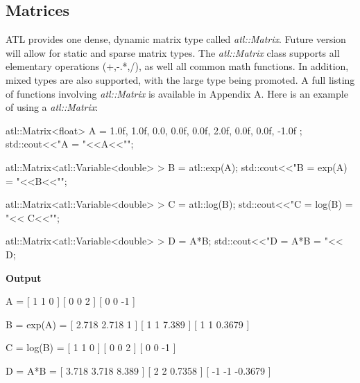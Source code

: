 \documentclass[12pt,a4paper]{article}
\begin{document}
\subsection{Matrices}
ATL provides one dense, dynamic matrix type called \textit{atl::Matrix}. Future version will allow for static and sparse matrix types. The \textit{atl::Matrix} class supports all elementary operations (+,-.*,/), as well all common math functions. In addition, mixed types are also supported, with the large type being promoted. A full listing of functions involving \textit{atl::Matrix} is available in Appendix A. Here is an example of using a \textit{atl::Matrix}:
\begin{cppsource}
 
    atl::Matrix<float> A = {
        {1.0f, 1.0f, 0.0},
        {0.0f, 0.0f, 2.0f},
        { 0.0f, 0.0f, -1.0f}
    };
    std::cout<<"A = \n"<<A<<"\n";
    

    atl::Matrix<atl::Variable<double> > B = atl::exp(A);
    std::cout<<"B = exp(A) = \n"<<B<<"\n";
    
    atl::Matrix<atl::Variable<double> > C = atl::log(B);
    std::cout<<"C = log(B) = \n"<< C<<"\n";
    
    atl::Matrix<atl::Variable<double> > D = A*B;
    std::cout<<"D = A*B = \n"<< D;
  
\end{cppsource}
\textbf{Output}
\begin{myoutput}

A = 
[       1       1       0 ]
[       0       0       2 ]
[       0       0      -1 ]

B = exp(A) = 
[   2.718   2.718       1 ]
[       1       1   7.389 ]
[       1       1  0.3679 ]

C = log(B) = 
[       1       1       0 ]
[       0       0       2 ]
[       0       0      -1 ]

D = A*B = 
[   3.718   3.718   8.389 ]
[       2       2  0.7358 ]
[      -1      -1 -0.3679 ]


\end{myoutput}
\end{document}
